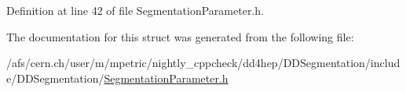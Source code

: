 Definition at line 42 of file SegmentationParameter.h.

The documentation for this struct was generated from the following file:\begin{DoxyCompactItemize}
\item 
/afs/cern.ch/user/m/mpetric/nightly\_\-cppcheck/dd4hep/DDSegmentation/include/DDSegmentation/\hyperlink{_segmentation_parameter_8h}{SegmentationParameter.h}\end{DoxyCompactItemize}
